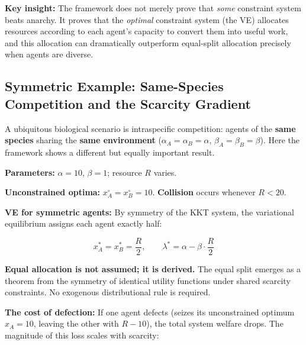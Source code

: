 \documentclass[11pt]{article}
\theoremstyle{plain}
\theoremstyle{definition}
\theoremstyle{remark}
\let\origsubsection\subsection
\renewcommand{\subsection}{\needspace{7\baselineskip}\origsubsection}
\begin{document}
\textbf{Key insight:} The framework does not merely prove that
\emph{some} constraint system beats anarchy. It proves that the
\emph{optimal} constraint system (the VE) allocates resources according
to each agent's capacity to convert them into useful work, and this
allocation can dramatically outperform equal-split allocation precisely
when agents are diverse.

\subsection{Symmetric Example: Same-Species Competition and the Scarcity
Gradient}\label{symmetric-example-same-species-competition-and-the-scarcity-gradient}

A ubiquitous biological scenario is intraspecific competition: agents of
the \textbf{same species} sharing the \textbf{same environment}
(\(\alpha_A = \alpha_B = \alpha\), \(\beta_A = \beta_B = \beta\)). Here
the framework shows a different but equally important result.

\textbf{Parameters:} \(\alpha = 10\), \(\beta = 1\); resource \(R\)
varies.

\textbf{Unconstrained optima:} \(x_A^{\circ} = x_B^{\circ} = 10\).
\textbf{Collision} occurs whenever \(R < 20\).

\textbf{VE for symmetric agents:} By symmetry of the KKT system, the
variational equilibrium assigns each agent exactly half:

\[x_A^* = x_B^* = \frac{R}{2}, \qquad \lambda^* = \alpha - \beta \cdot \frac{R}{2}\]

\textbf{Equal allocation is not assumed; it is derived.} The equal split
emerges as a theorem from the symmetry of identical utility functions
under shared scarcity constraints. No exogenous distributional rule is
required.

\textbf{The cost of defection:} If one agent defects (seizes its
unconstrained optimum \(x_A = 10\), leaving the other with \(R - 10\)),
the total system welfare drops. The magnitude of this loss scales with
scarcity:
\end{document}
